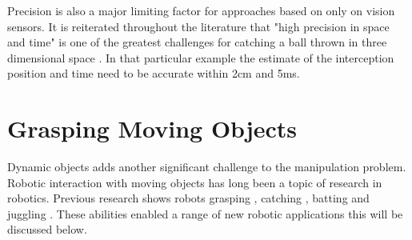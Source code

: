 Precision is also a major limiting factor for approaches based on only on vision sensors. It is reiterated throughout the literature that "high precision in space and time" is one of the greatest challenges for catching a ball thrown in three dimensional space \cite{RollinJustin}. In that particular example the estimate of the interception position and time need to be accurate within 2cm and 5ms.


\section{Grasping Moving Objects}

Dynamic objects adds another significant challenge to the manipulation problem. Robotic interaction with moving objects has long been a topic of research in robotics\cite{Buhler1989, 1991BallTracking}. Previous research shows robots grasping \cite{ConveyorBeltTracking, ConveyorUnknownObject}, catching \cite{TennisRacket, RollinJustin, DisneyRobot, HandEye, CatchingSoftly}, batting \cite{Muelling2014, Senoo2006} and juggling \cite{JugglingWithKitchenFunnels, Buhler1989, OneHandedJuggling}. These abilities enabled a range of new robotic applications this will be discussed below.

